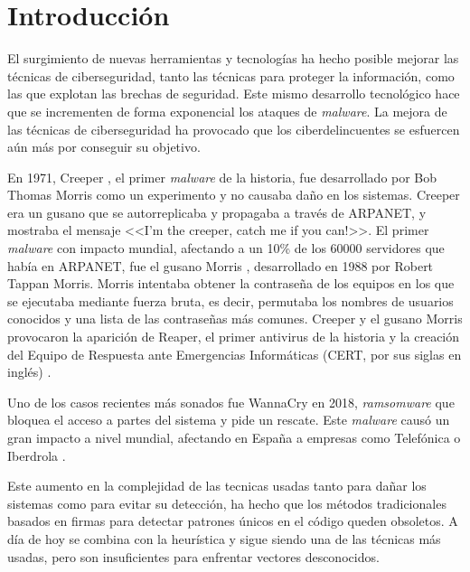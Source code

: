 \chapter{Introducción}
\label{ch:introduccion}

El surgimiento de nuevas herramientas y tecnologías ha hecho posible mejorar las técnicas de ciberseguridad, tanto las técnicas para proteger la información, como las que explotan las brechas de seguridad. Este mismo desarrollo tecnológico hace que se incrementen de forma exponencial los ataques de \textit{malware}. La mejora de las técnicas de ciberseguridad ha provocado que los ciberdelincuentes se esfuercen aún más por conseguir su objetivo.

\vspace{1em}

En 1971, Creeper \cite{creeper}, el primer \textit{malware} de la historia, fue desarrollado por Bob Thomas Morris como un experimento y no causaba daño en los sistemas. Creeper era un gusano que se autorreplicaba y propagaba a través de ARPANET, y mostraba el mensaje <<I'm the creeper, catch me if you can!>>. El primer \textit{malware} con impacto mundial, afectando a un 10\% de los 60000 servidores que había en ARPANET, fue el gusano Morris \cite{morris}, desarrollado en 1988 por Robert Tappan Morris. Morris intentaba obtener la contraseña de los equipos en los que se ejecutaba mediante fuerza bruta, es decir, permutaba los nombres de usuarios conocidos y una lista de las contraseñas más comunes. Creeper y el gusano Morris provocaron la aparición de Reaper, el primer antivirus de la historia y la creación del Equipo de Respuesta ante Emergencias Informáticas (CERT, por sus siglas en inglés) \cite{cert}.

\vspace{1em}

Uno de los casos recientes más sonados fue WannaCry \cite{wannacry} en 2018, \textit{ramsomware} \cite{ransomware} que bloquea el acceso a partes del sistema y pide un rescate. Este \textit{malware} causó un gran impacto a nivel mundial, afectando en España a empresas como Telefónica o Iberdrola \cite{noticia_wannacry}.

\vspace{1em}

Este aumento en la complejidad de las tecnicas usadas tanto para dañar los sistemas como para evitar su detección, ha hecho que los métodos tradicionales basados en firmas \cite{firmas} para detectar patrones únicos en el código queden obsoletos. A día de hoy se combina con la heurística y sigue siendo una de las técnicas más usadas, pero son insuficientes para enfrentar vectores desconocidos.


